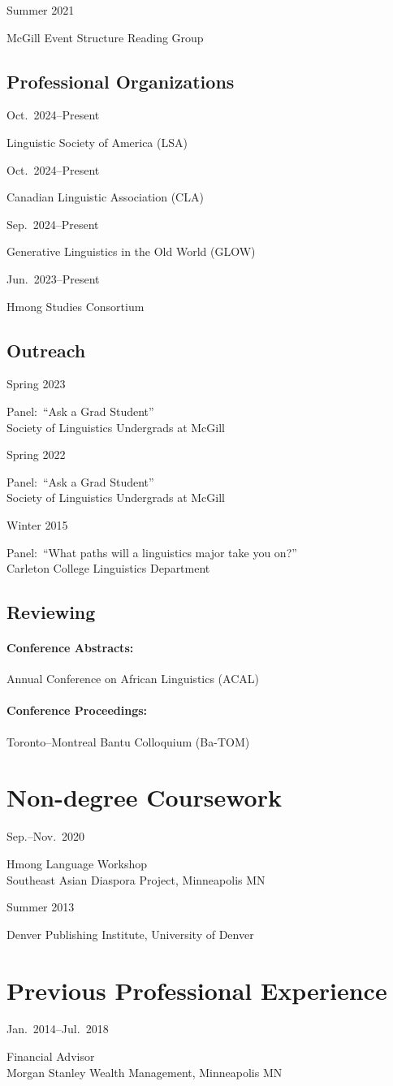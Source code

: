\documentclass[11pt,oneside,DIV=8,parskip=off,letterpaper]{scrarticle} %
\newlength{\leftcolwidth}
\newlength{\mycolspace}
\newlength{\rightcolwidth}
\newlength{\spacingbefore}
\newlength{\spacingafter}
\newcommand{\mytwocol}[2]{%
	\vspace{\spacingbefore}%
	\begin{minipage}[t]{\leftcolwidth}%
		\strut#1%
	\end{minipage}%
	\hspace{\mycolspace}%
	\begin{minipage}[t]{\rightcolwidth}%
		\strut#2%
	\end{minipage}%
	\vspace{\spacingafter}\par%
	}
\newcommand{\cvline}[2]{%
	\mytwocol{#1}{#2}%
	}
\begin{document}
\cvline{Summer 2021}{McGill Event Structure Reading Group}

\subsection{Professional Organizations}
\cvline{Oct.\ 2024--Present}{Linguistic Society of America (LSA)}
\cvline{Oct.\ 2024--Present}{Canadian Linguistic Association (CLA)}
\cvline{Sep.\ 2024--Present}{Generative Linguistics in the Old World (GLOW)}
\cvline{Jun.\ 2023--Present}{Hmong Studies Consortium}

\subsection{Outreach}
\cvline{Spring 2023}{Panel:\ ``Ask a Grad Student''\\Society of Linguistics Undergrads at McGill}

\cvline{Spring 2022}{Panel:\ ``Ask a Grad Student''\\Society of Linguistics Undergrads at McGill}

\cvline{Winter 2015}{Panel:\ ``What paths will a linguistics major take you on?''\\Carleton College Linguistics Department}

\subsection{Reviewing}

\paragraph{Conference Abstracts:} Annual Conference on African Linguistics (ACAL)

\paragraph{Conference Proceedings:} Toronto--Montreal Bantu Colloquium (Ba-TOM)

\section{Non-degree Coursework}
\cvline{Sep.--Nov.\ 2020}{Hmong Language Workshop\\Southeast Asian Diaspora Project, Minneapolis MN}
\cvline{Summer 2013}{Denver Publishing Institute, University of Denver}

\section{Previous Professional Experience}
\cvline{Jan.\ 2014--Jul.\ 2018}{Financial Advisor\\Morgan Stanley Wealth Management, Minneapolis MN}

\end{document}
